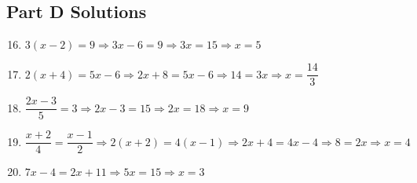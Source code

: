 \documentclass[14pt]{extarticle}
\begin{document}
\subsection*{Part D Solutions}
\begin{enumerate}
    \setcounter{enumi}{15}
    \item \(3(x - 2) = 9 \Rightarrow 3x - 6 = 9 \Rightarrow 3x = 15 \Rightarrow x = 5\)
    \item \(2(x + 4) = 5x - 6 \Rightarrow 2x + 8 = 5x - 6 \Rightarrow 14 = 3x \Rightarrow x = \dfrac{14}{3}\)
    \item \(\dfrac{2x - 3}{5} = 3 \Rightarrow 2x - 3 = 15 \Rightarrow 2x = 18 \Rightarrow x = 9\)
    \item \(\dfrac{x + 2}{4} = \dfrac{x - 1}{2} \Rightarrow 2(x + 2) = 4(x - 1) \Rightarrow 2x + 4 = 4x - 4 \Rightarrow 8 = 2x \Rightarrow x = 4\)
    \item \(7x - 4 = 2x + 11 \Rightarrow 5x = 15 \Rightarrow x = 3\)
\end{enumerate}

\newpage

\end{document}
